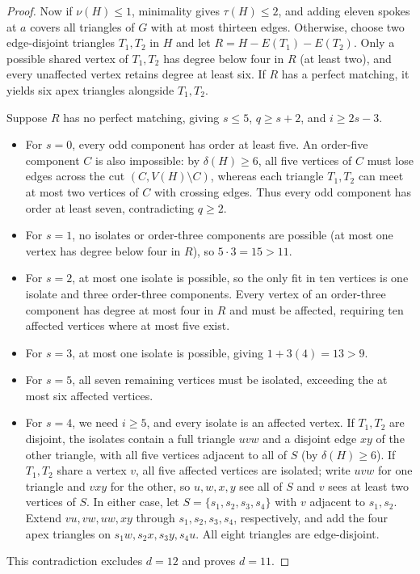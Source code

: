 \documentclass[11pt]{article}
\begin{document}
\begin{proof}
Now if $\nu(H)\leq 1$, minimality gives $\tau(H)\leq 2$, and adding eleven spokes at $a$ covers all triangles of $G$ with at most thirteen edges. Otherwise, choose two edge-disjoint triangles $T_1,T_2$ in $H$ and let $R=H-E(T_1)-E(T_2)$. Only a possible shared vertex of $T_1,T_2$ has degree below four in $R$ (at least two), and every unaffected vertex retains degree at least six. If $R$ has a perfect matching, it yields six apex triangles alongside $T_1,T_2$.

Suppose $R$ has no perfect matching, giving $s\leq 5$, $q\geq s+2$, and $i\geq 2s-3$.
\begin{itemize}
\item For $s=0$, every odd component has order at least five. An order-five component $C$ is also impossible: by $\delta(H)\geq 6$, all five vertices of $C$ must lose edges across the cut $(C,V(H)\setminus C)$, whereas each triangle $T_1,T_2$ can meet at most two vertices of $C$ with crossing edges. Thus every odd component has order at least seven, contradicting $q\geq 2$.
\item For $s=1$, no isolates or order-three components are possible (at most one vertex has degree below four in $R$), so $5\cdot 3=15>11$.
\item For $s=2$, at most one isolate is possible, so the only fit in ten vertices is one isolate and three order-three components. Every vertex of an order-three component has degree at most four in $R$ and must be affected, requiring ten affected vertices where at most five exist.
\item For $s=3$, at most one isolate is possible, giving $1+3(4)=13>9$.
\item For $s=5$, all seven remaining vertices must be isolated, exceeding the at most six affected vertices.
\item For $s=4$, we need $i\geq 5$, and every isolate is an affected vertex. If $T_1,T_2$ are disjoint, the isolates contain a full triangle $uvw$ and a disjoint edge $xy$ of the other triangle, with all five vertices adjacent to all of $S$ (by $\delta(H)\geq 6$). If $T_1,T_2$ share a vertex $v$, all five affected vertices are isolated; write $uvw$ for one triangle and $vxy$ for the other, so $u,w,x,y$ see all of $S$ and $v$ sees at least two vertices of $S$. In either case, let $S=\{s_1,s_2,s_3,s_4\}$ with $v$ adjacent to $s_1,s_2$. Extend $vu,vw,uw,xy$ through $s_1,s_2,s_3,s_4$, respectively, and add the four apex triangles on $s_1w,s_2x,s_3y,s_4u$. All eight triangles are edge-disjoint.
\end{itemize}
This contradiction excludes $d=12$ and proves $d=11$.
\end{proof}
\end{document}
